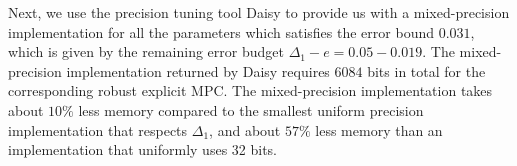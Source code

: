 
Next, we use the precision tuning tool Daisy to provide us with a mixed-precision 
implementation for all the parameters which satisfies the error bound $0.031$,
which is given by the remaining error budget $\Delta_1 - e = 0.05 - 0.019$.  
The mixed-precision implementation returned by Daisy requires $6084$ bits in total 
for the corresponding robust explicit MPC.
The mixed-precision implementation takes about $10\%$ less memory compared 
to the smallest uniform precision implementation that respects $\Delta_1$,
and about $57\%$ less memory than an implementation that uniformly uses
32 bits.

	
	
